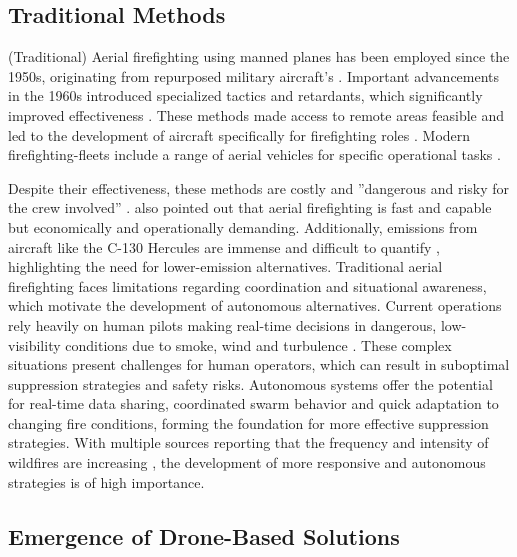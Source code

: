 \documentclass[twoside]{article}
\begin{document}
\subsection{Traditional Methods}

(Traditional) Aerial firefighting using manned planes has been employed since the 1950s, originating from repurposed military aircraft's \citep{janney2012airtankers}. Important advancements in the 1960s introduced specialized tactics and retardants, which significantly improved effectiveness \citep{struminskaFlightPerformanceAnalysis2024}.
These methods made access to remote areas feasible and led to the development of aircraft specifically for firefighting roles \citep{struminskaFlightPerformanceAnalysis2024,LockheedSuperHercules}. Modern firefighting-fleets include a range of aerial vehicles for specific operational tasks \citep{FleetInformationFirefighting}. 

Despite their effectiveness, these methods are costly and ''dangerous and risky for the crew involved'' \citep[p. 1896]{struminskaFlightPerformanceAnalysis2024}. \citet{struminskaFlightPerformanceAnalysis2024} also pointed out that aerial firefighting is fast and capable but economically and operationally demanding. Additionally, emissions from aircraft like the C-130 Hercules are immense and difficult to quantify \citep{LockheedC130Hercules2022,spicerRapidMeasurementEmissions2009}, highlighting the need for lower-emission alternatives.
Traditional aerial firefighting faces limitations regarding coordination and situational awareness, which motivate the development of autonomous alternatives. Current operations rely heavily on human pilots making real-time decisions in dangerous, low-visibility conditions due to smoke, wind and turbulence \citep{struminskaFlightPerformanceAnalysis2024}. These complex situations present challenges for human operators, which can result in suboptimal suppression strategies and safety risks. Autonomous systems offer the potential for real-time data sharing, coordinated swarm behavior and quick adaptation to changing fire conditions, forming the foundation for more effective suppression strategies. With multiple sources reporting that the frequency and intensity of wildfires are increasing \citep{copernicus-wildfires,IPCC2023,grassland_Wildfires}, the development of more responsive and autonomous strategies is of high importance.

\subsection{Emergence of Drone-Based Solutions}
\end{document}
